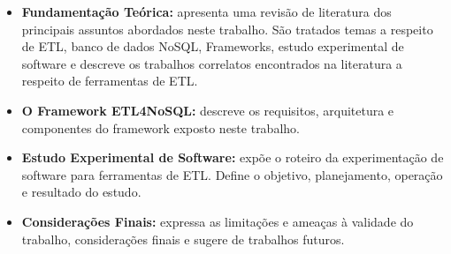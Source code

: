 \begin{itemize}
	\item \textbf{Fundamentação Teórica:} apresenta uma revisão de literatura dos principais assuntos abordados neste trabalho. São tratados temas a respeito de ETL, banco de dados NoSQL, Frameworks, estudo experimental de software e descreve os trabalhos correlatos encontrados na literatura a respeito de ferramentas de ETL.
	
	\item \textbf{O Framework ETL4NoSQL:} descreve os requisitos, arquitetura e componentes do framework exposto neste trabalho.
	
	\item \textbf{Estudo Experimental de Software:} expõe o roteiro da experimentação de software para ferramentas de ETL. Define o objetivo, planejamento, operação e resultado do estudo.
	
	\item \textbf{Considerações Finais:} expressa as limitações e ameaças à validade do trabalho, considerações finais e sugere de trabalhos futuros.	
	
\end{itemize}

